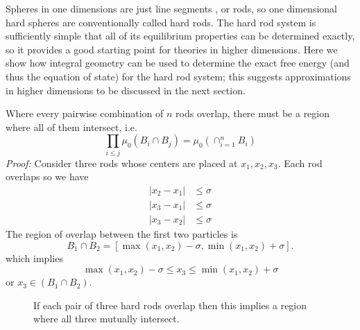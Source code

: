 \documentclass[12pt]{report}
\begin{document}
Spheres in one dimensions are just line segments%
,
or rods, so one dimensional hard spheres are conventionally called hard rods.
The hard rod system is sufficiently simple that all of its equilibrium properties can be determined exactly, so it provides a good starting point for theories in higher dimensions.
Here we show how integral geometry can be used to determine the exact free energy (and thus the equation of state) for the hard rod system; this suggests approximations in higher dimensions to be discussed in the next section.

\begin{tcolorbox}[title=Multiple intersections of hard rods]
  Where every pairwise combination of $n$ rods overlap, there must be a region where all of them intersect, i.e.\
  \begin{equation}
    \prod_{i \le j} \mu_0(B_i \cap B_j) =
    \mu_0(\cap_{i=1}^n B_i)
  \end{equation}
  \emph{Proof:} Consider three rods whose centers are placed at $x_1, x_2, x_3$.
  Each rod overlaps so we have
  \begin{subequations}
    \begin{align}
      |x_2 - x_1| &\le \sigma \\
      |x_3 - x_1| &\le \sigma \\
      |x_3 - x_2| &\le \sigma
    \end{align}
  \end{subequations}
  The region of overlap between the first two particles is
  \begin{equation*}
    B_1 \cap B_2 =
    [\max{(x_1,x_2)} - \sigma, \min{(x_1,x_2)} + \sigma].
  \end{equation*}
  which implies
  \begin{equation}
    \max{(x_1,x_2)} - \sigma \le x_3 \le \min{(x_1,x_2)} + \sigma
  \end{equation}
  or $x_3 \in (B_1 \cap B_2)$.
\end{tcolorbox}

\begin{figure}
  \missingfigure[figwidth=\linewidth]{}
  \caption{If each pair of three hard rods overlap then this implies a region where all three mutually intersect.}
\end{figure}
\end{document}
